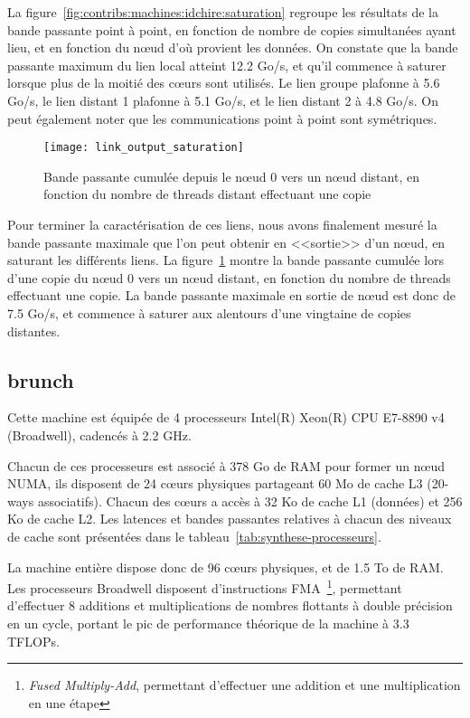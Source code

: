 La figure~\ref{fig:contribs:machines:idchire:saturation} regroupe les résultats de la bande passante point à point, en fonction de nombre de copies simultanées ayant lieu, et en fonction du nœud d'où provient les données.
On constate que la bande passante maximum du lien local atteint 12.2 Go/s, et qu'il commence à saturer lorsque plus de la moitié des cœurs sont utilisés.
Le lien groupe plafonne à 5.6 Go/s, le lien distant 1 plafonne à 5.1 Go/s, et le lien distant 2 à 4.8 Go/s.
On peut également noter que les communications point à point sont symétriques.

\begin{figure}[ht]
  \centering
  \texttt{[image: link\_output\_saturation]}
  \caption{Bande passante cumulée depuis le nœud 0 vers un nœud distant, en fonction du nombre de threads distant effectuant une copie}\label{fig:contribs:machines:idchire:saturation-output}
\end{figure}

Pour terminer la caractérisation de ces liens, nous avons finalement mesuré la bande passante maximale que l'on peut obtenir en <<sortie>> d'un nœud, en saturant les différents liens.
La figure~\ref{fig:contribs:machines:idchire:saturation-output} montre la bande passante cumulée lors d'une copie du nœud 0 vers un nœud distant, en fonction du nombre de threads effectuant une copie.
La bande passante maximale en sortie de nœud est donc de 7.5 Go/s, et commence à saturer aux alentours d'une vingtaine de copies distantes.



\subsection{brunch}\label{sec:contribs:machines:brunch}

Cette machine est équipée de 4 processeurs Intel(R) Xeon(R) CPU E7-8890 v4 (Broadwell), cadencés à 2.2 GHz.

Chacun de ces processeurs est associé à 378 Go de RAM pour former un nœud NUMA, ils disposent de 24 cœurs physiques partageant 60 Mo de cache L3 (20-ways associatifs).
Chacun des cœurs a accès à 32 Ko de cache L1 (données) et 256 Ko de cache L2.
Les latences et bandes passantes relatives à chacun des niveaux de cache sont présentées dans le tableau~\ref{tab:synthese-processeurs}.

La machine entière dispose donc de 96 cœurs physiques, et de 1.5 To de RAM.
Les processeurs Broadwell disposent d'instructions FMA~\footnote{\emph{Fused Multiply-Add}, permettant d'effectuer une addition et une multiplication en une étape}, permettant d'effectuer 8 additions et multiplications de nombres flottants à double précision en un cycle, portant le pic de performance théorique de la machine à 3.3 TFLOPs.


